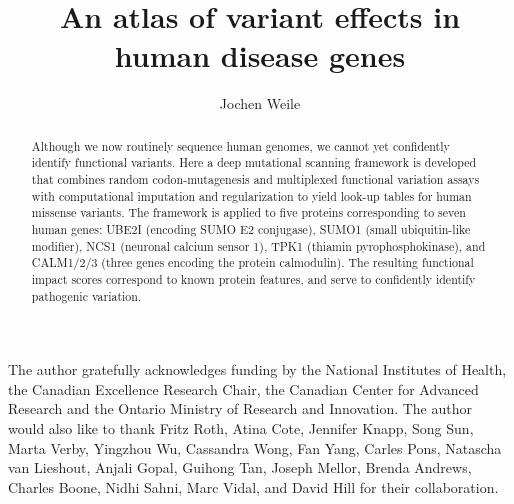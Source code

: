 \documentclass[12pt]{ut-thesis}
\author{Jochen Weile}
\title{An atlas of variant effects in human disease genes}
\begin{document}
\begin{preliminary}

\maketitle


\begin{abstract}

Although we now routinely sequence human genomes, we cannot yet confidently identify functional variants. Here a deep mutational scanning framework is developed that combines random codon-mutagenesis and multiplexed functional variation assays with computational imputation and regularization to yield look-up tables for human missense variants. The framework is applied to five proteins corresponding to seven human genes: UBE2I (encoding SUMO E2 conjugase), SUMO1 (small ubiquitin-like modifier), NCS1 (neuronal calcium sensor 1), TPK1 (thiamin pyrophosphokinase), and CALM1/2/3 (three genes encoding the protein calmodulin). The resulting functional impact scores correspond to known protein features, and serve to confidently identify pathogenic variation. %
\end{abstract}



\begin{acknowledgements}
The author gratefully acknowledges funding by the National Institutes of Health, the Canadian Excellence Research Chair, the Canadian Center for Advanced Research and the Ontario Ministry of Research and Innovation. The author would also like to thank Fritz Roth, Atina Cote, Jennifer Knapp, Song Sun, Marta Verby, Yingzhou Wu, Cassandra Wong, Fan Yang, Carles Pons, Natascha van Lieshout, Anjali Gopal,  Guihong Tan, Joseph Mellor, Brenda Andrews, Charles Boone, Nidhi Sahni, Marc Vidal, and David Hill for their collaboration.
\end{acknowledgements}

\tableofcontents




\end{preliminary}











{\small

}
\end{document}
